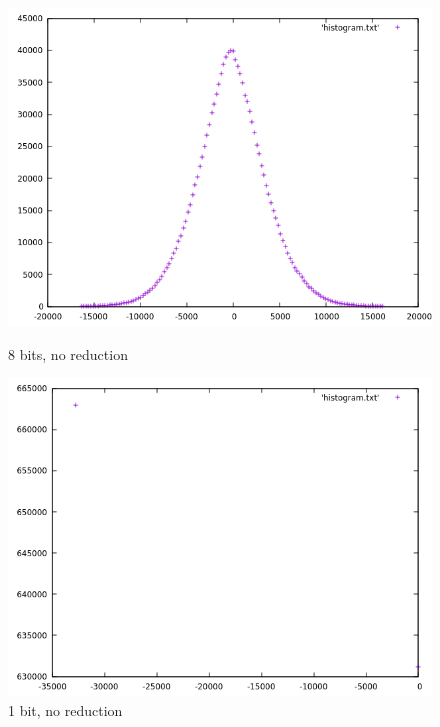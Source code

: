 \documentclass[12pt]{article}
\begin{document}
\begin{figure}[H]
  \begin{minipage}{.5\textwidth}
    \centering
    \includegraphics[width=\linewidth]{sample01_8_1.png}
    \caption{{8 bits, no reduction}}
    \label{fig:8_no}
  \end{minipage}
  \begin{minipage}{.5\textwidth}
    \centering
    \includegraphics[width=\linewidth]{sample01_1_1.png}
    \caption{{1 bit, no reduction}}
    \label{fig:1_no}
  \end{minipage}
\end{figure}
\end{document}
